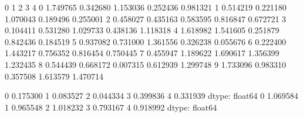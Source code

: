 \documentclass[letterpaper,10pt,english]{sphinxmanual}
\begin{document}
\begin{sphinxVerbatim}[commandchars=\\\{\}]
   
   
   
  
  
  
  
\end{sphinxVerbatim}

\begin{sphinxVerbatim}[commandchars=\\\{\}]
          0         1         2         3         4
0 \PYGZhy{}1.749765  0.342680  1.153036 \PYGZhy{}0.252436  0.981321
1  0.514219  0.221180 \PYGZhy{}1.070043 \PYGZhy{}0.189496  0.255001
2 \PYGZhy{}0.458027  0.435163 \PYGZhy{}0.583595  0.816847  0.672721
3 \PYGZhy{}0.104411 \PYGZhy{}0.531280  1.029733 \PYGZhy{}0.438136 \PYGZhy{}1.118318
4  1.618982  1.541605 \PYGZhy{}0.251879 \PYGZhy{}0.842436  0.184519
5  0.937082  0.731000  1.361556 \PYGZhy{}0.326238  0.055676
6  0.222400 \PYGZhy{}1.443217 \PYGZhy{}0.756352  0.816454  0.750445
7 \PYGZhy{}0.455947  1.189622 \PYGZhy{}1.690617 \PYGZhy{}1.356399 \PYGZhy{}1.232435
8 \PYGZhy{}0.544439 \PYGZhy{}0.668172  0.007315 \PYGZhy{}0.612939  1.299748
9 \PYGZhy{}1.733096 \PYGZhy{}0.983310  0.357508 \PYGZhy{}1.613579  1.470714
\end{sphinxVerbatim}

\begin{sphinxVerbatim}[commandchars=\\\{\}]
0   \PYGZhy{}0.175300
1    0.083527
2   \PYGZhy{}0.044334
3   \PYGZhy{}0.399836
4    0.331939
dtype: float64
0    1.069584
1    0.965548
2    1.018232
3    0.793167
4    0.918992
dtype: float64
\end{sphinxVerbatim}
\end{document}

